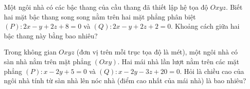 \begin{bt}%
	Một ngôi nhà có các bậc thang của cầu thang đã thiết lập hệ tọa độ $Oxyz$. Biết hai mặt bậc thang song song nằm trên hai mặt phẳng phân biệt $(P)\colon 2x-y+2z+8=0$ và $(Q)\colon 2x-y+2z+2=0$. Khoảng cách giữa hai  bậc thang này bằng bao nhiêu?
\end{bt}

\begin{bt}%
	Trong không gian $Oxyz$ (đơn vị trên mỗi trục tọa độ là mét), một ngôi nhà có sàn nhà nằm trên mặt phẳng  $(Oxy)$. Hai mái nhà lần lượt nằm trên các mặt phẳng $(P)\colon x-2y+5=0$ và $(Q)\colon x-2y-3z+20=0$. Hỏi là chiều cao của ngôi nhà tính từ sàn nhà lên nóc nhà (điểm cao nhất của mái nhà) là bao nhiêu?
\end{bt}

